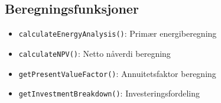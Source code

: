 \documentclass[12pt,a4paper]{article}
\begin{document}
\subsection{Beregningsfunksjoner}
\begin{itemize}
\item \texttt{calculateEnergyAnalysis()}: Primær energiberegning
\item \texttt{calculateNPV()}: Netto nåverdi beregning
\item \texttt{getPresentValueFactor()}: Annuitetsfaktor beregning
\item \texttt{getInvestmentBreakdown()}: Investeringsfordeling
\end{itemize}
\end{document}
